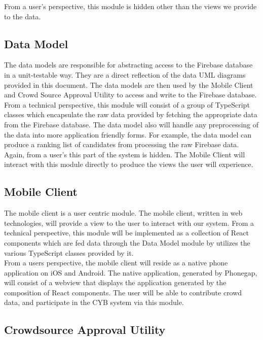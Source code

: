 \documentclass[11pt]{article}
\begin{document}
From a user's perspective, this module is hidden other than the views we provide to the data.

\subsection*{Data Model}

The data models are responsible for abstracting access to the Firebase database in a unit-testable way. They are a direct reflection of the data UML diagrams provided in this document. The data models are then used by the Mobile Client and Crowd Source Approval Utility to access and write to the Firebase database. From a technical perspective, this module will consist of a group of TypeScript classes which encapsulate the raw data provided by fetching the appropriate data from the Firebase database. The data model also will handle any preprocessing of the data into more application friendly forms. For example, the data model can produce a ranking list of candidates from processing the raw Firebase data.\\

Again, from a user's this part of the system is hidden. The Mobile Client will interact with this module directly to produce the views the user will experience.

\subsection*{Mobile Client}

The mobile client is a user centric module. The mobile client, written in web technologies, will provide a view to the user to interact with our system. From a technical perspective, this module will be implemented as a collection of React components which are fed data through the Data Model module by utilizes the various TypeScript classes provided by it.\\

From a users perspective, the mobile client will reside as a native phone application on iOS and Android. The native application, generated by Phonegap, will consist of a webview that displays the application generated by the composition of React components. The user will be able to contribute crowd data, and participate in the CYB system via this module.

\subsection*{Crowdsource Approval Utility}
\end{document}
